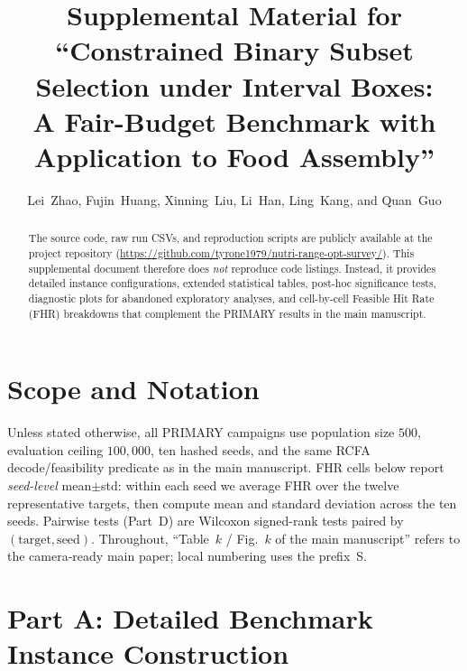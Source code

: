 \documentclass[lettersize,journal,onecolumn]{IEEEtran}
\begin{document}
\title{Supplemental Material for\\
``Constrained Binary Subset Selection under Interval Boxes:\\
A Fair-Budget Benchmark with Application to Food Assembly''}

\author{Lei~Zhao, Fujin~Huang, Xinning~Liu, Li~Han, Ling~Kang, and Quan~Guo}

\maketitle
{}
\renewcommand{\thepage}{S\arabic{page}}
\renewcommand{\thetable}{S\arabic{table}}
\renewcommand{\thefigure}{S\arabic{figure}}
\renewcommand{\theequation}{S\arabic{equation}}
\setcounter{page}{1}
\setcounter{table}{0}
\setcounter{figure}{0}

\begin{abstract}
The source code, raw run CSVs, and reproduction scripts are publicly available at the project repository
(\url{https://github.com/tyrone1979/nutri-range-opt-survey/}).
This supplemental document therefore does \emph{not} reproduce code listings.
Instead, it provides detailed instance configurations, extended statistical tables, post-hoc significance tests,
diagnostic plots for abandoned exploratory analyses, and cell-by-cell Feasible Hit Rate (FHR) breakdowns that
complement the PRIMARY results in the main manuscript.
\end{abstract}

\section*{Scope and Notation}
Unless stated otherwise, all PRIMARY campaigns use population size $500$, evaluation ceiling $100{,}000$,
ten hashed seeds, and the same RCFA decode/feasibility predicate as in the main manuscript.
FHR cells below report \emph{seed-level} mean$\pm$std: within each seed we average FHR over the twelve representative targets,
then compute mean and standard deviation across the ten seeds.
Pairwise tests (Part~D) are Wilcoxon signed-rank tests paired by $(\mathrm{target},\mathrm{seed})$.
Throughout, ``Table~$k$ / Fig.~$k$ of the main manuscript'' refers to the camera-ready main paper;
local numbering uses the prefix~S.

\section{Part A: Detailed Benchmark Instance Construction}
\label{sec:sa}
\end{document}
